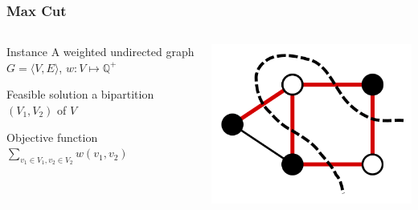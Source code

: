 \documentclass[12pt,aspectratio=169]{beamer}
\begin{document}
\begin{frame}\frametitle{Max Cut }
\begin{columns} 
  \begin{column}{0.48\textwidth}
  \begin{block}{Instance}
    A weighted undirected  graph $G=\langle V,E \rangle$, $w:V\mapsto \mathbb{Q}^{+}$
  \end{block}
  \begin{block}{Feasible solution}
    a bipartition $(V_{1},V_{2})$ of $V$
  \end{block}
  \begin{block}{Objective function}
    $\sum_{v_{1}\in V_{1}, v_{2}\in V_{2}} w(v_{1}, v_{2})$
  \end{block}
\end{column}
    
    \begin{column}{0.48\textwidth}
      \centering
  \includegraphics[height=0.7\textheight]{img/Max-cut}
\end{column}
\end{columns}
\end{frame}
\end{document}
